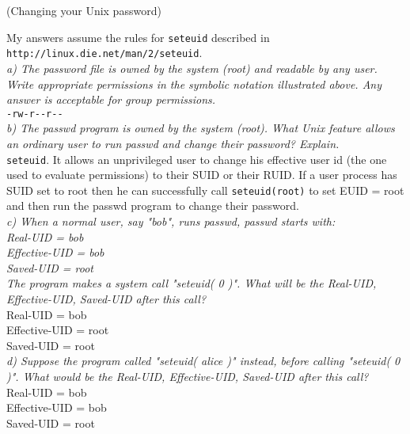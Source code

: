 \begin{prob}  (Changing your Unix password) 
\end{prob}

\noindent My answers assume the rules for \verb+seteuid+ described in \verb+http://linux.die.net/man/2/seteuid+.\\

\noindent \textit{a) The password file is owned by the system (root) and readable by any user. Write appropriate permissions in the symbolic notation illustrated above. Any answer is acceptable for group permissions.}\\

 \verb+-rw-r--r--+\\

\noindent \textit{b) The passwd program is owned by the system (root). What Unix feature allows an ordinary user to run passwd and change their password? Explain.}\\

 \verb+seteuid+. It allows an unprivileged user to change his effective user id (the one used to evaluate permissions) to their SUID or their RUID. If a user process has SUID set to root then he can successfully call \verb+seteuid(root)+ to set EUID = root and then run the passwd program to change their password.\\

\noindent \textit{c) When a normal user, say "bob", runs passwd, passwd starts with:\\
      \indent Real-UID = bob \\
      \indent Effective-UID = bob\\ 
      \indent Saved-UID = root \\
The program makes a system call "seteuid( 0 )". What will be the Real-UID, Effective-UID, Saved-UID after this call?}\\

      \indent Real-UID = bob \\
      \indent Effective-UID = root\\ 
      \indent Saved-UID = root \\

\noindent \textit{d) Suppose the program called "seteuid( alice )" instead, before calling "seteuid( 0 )". What would be the Real-UID, Effective-UID, Saved-UID after this call?}\\

      \indent Real-UID = bob \\
      \indent Effective-UID = bob\\ 
      \indent Saved-UID = root \\

